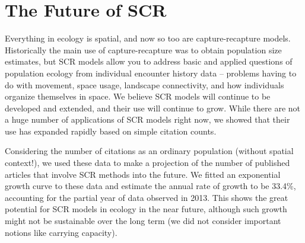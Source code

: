 \section{The Future of SCR}

Everything in ecology is spatial, and now so too are capture-recapture
models.
Historically the main use of capture-recapture was to obtain population
size estimates, but
SCR models allow you to address basic and applied questions of
population ecology from individual encounter history data -- problems
having to do with movement, space usage, landscape connectivity, and
how individuals organize themselves in space.
We believe SCR models will continue to be developed and
extended, and their use will continue to grow. While there are not
a huge number of applications of SCR models right now, we showed that
their use has expanded rapidly based on simple citation counts.

Considering the number of citations as an ordinary population (without
spatial context!), we used these data to make a projection of the
number of published articles that involve SCR methods into the future.
We fitted an exponential growth curve to these data and estimate the
annual rate of growth to be 33.4\%, accounting for the partial year of
data observed in 2013.  This shows the great potential for SCR models in
ecology in the near future, although such growth might not be sustainable
over the long term (we did not
consider important notions like carrying capacity).


